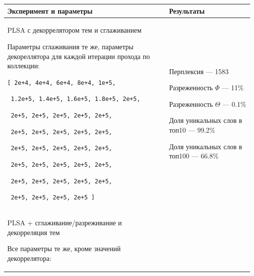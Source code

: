 \noindent
\begin{tabular}[t]{|p{29em}|p{12em}|}
\hline
\vspace{2pt} \textbf{Эксперимент и параметры} \vspace{4pt} &
\vspace{2pt} \textbf{Результаты} \vspace{4pt} \\

\hline
\vspace{4pt}
PLSA с декоррелятором тем и сглаживанием

Параметры сглаживания те же, параметры декореллятора для каждой итерации прохода по коллекции: 
                  
\vspace{4pt}                  
                  
				  \verb|[ 2e+4, 4e+4, 6e+4, 8e+4, 1e+5,| 
				  
	                 \verb| 1.2e+5, 1.4e+5, 1.6e+5, 1.8e+5, 2e+5,|
	                 
	                 \verb| 2e+5, 2e+5, 2e+5, 2e+5, 2e+5, |
	                 
	                 \verb| 2e+5, 2e+5, 2e+5, 2e+5, 2e+5, | 
	                 
	                 \verb| 2e+5, 2e+5, 2e+5, 2e+5, 2e+5, |
	                 
	                 \verb| 2e+5, 2e+5, 2e+5, 2e+5, 2e+5, |
	                 
	                 \verb| 2e+5, 2e+5, 2e+5, 2e+5, 2e+5, |
	                 
	                 \verb| 2e+5, 2e+5, 2e+5, 2e+5 ] |                    
	                 
&
\vspace{4pt}

Перплексия --- 1583

Разреженность $\Phi$ --- 11\%

Разреженность $\Theta$ --- 0.1\%

Доля уникальных слов в топ10 --- 99.2\%

Доля уникальных слов в топ100 --- 66.8\%

\vspace{4pt}
\\
\hline
\vspace{4pt}

PLSA + сглаживание/разреживание и декорреляция тем

Все параметры те же, кроме значений декоррелятора:
\vspace{4pt}


\end{tabular}
